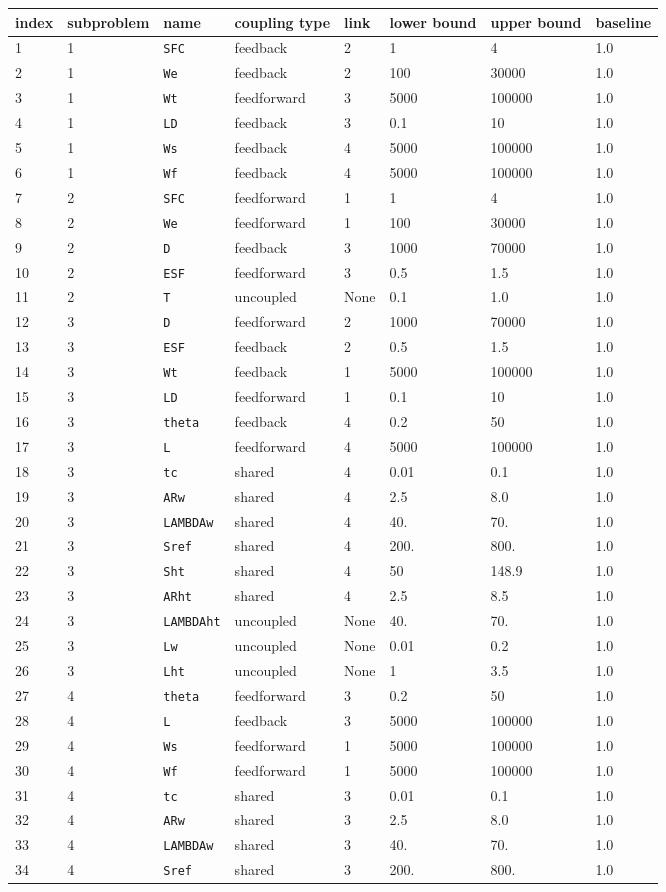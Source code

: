 \documentclass[11pt]{article}
\begin{document}
\begin{longtable}[]{@{}llllllll@{}}
\toprule
index & subproblem & name & coupling type & link & lower bound & upper
bound & baseline\tabularnewline
\midrule
\endhead
1 & 1 & \texttt{SFC} & feedback & 2 & 1 & 4 & 1.0\tabularnewline
2 & 1 & \texttt{We} & feedback & 2 & 100 & 30000 & 1.0\tabularnewline
3 & 1 & \texttt{Wt} & feedforward & 3 & 5000 & 100000 &
1.0\tabularnewline
4 & 1 & \texttt{LD} & feedback & 3 & 0.1 & 10 & 1.0\tabularnewline
5 & 1 & \texttt{Ws} & feedback & 4 & 5000 & 100000 & 1.0\tabularnewline
6 & 1 & \texttt{Wf} & feedback & 4 & 5000 & 100000 & 1.0\tabularnewline
7 & 2 & \texttt{SFC} & feedforward & 1 & 1 & 4 & 1.0\tabularnewline
8 & 2 & \texttt{We} & feedforward & 1 & 100 & 30000 & 1.0\tabularnewline
9 & 2 & \texttt{D} & feedback & 3 & 1000 & 70000 & 1.0\tabularnewline
10 & 2 & \texttt{ESF} & feedforward & 3 & 0.5 & 1.5 & 1.0\tabularnewline
11 & 2 & \texttt{T} & uncoupled & None & 0.1 & 1.0 & 1.0\tabularnewline
12 & 3 & \texttt{D} & feedforward & 2 & 1000 & 70000 &
1.0\tabularnewline
13 & 3 & \texttt{ESF} & feedback & 2 & 0.5 & 1.5 & 1.0\tabularnewline
14 & 3 & \texttt{Wt} & feedback & 1 & 5000 & 100000 & 1.0\tabularnewline
15 & 3 & \texttt{LD} & feedforward & 1 & 0.1 & 10 & 1.0\tabularnewline
16 & 3 & \texttt{theta} & feedback & 4 & 0.2 & 50 & 1.0\tabularnewline
17 & 3 & \texttt{L} & feedforward & 4 & 5000 & 100000 &
1.0\tabularnewline
18 & 3 & \texttt{tc} & shared & 4 & 0.01 & 0.1 & 1.0\tabularnewline
19 & 3 & \texttt{ARw} & shared & 4 & 2.5 & 8.0 & 1.0\tabularnewline
20 & 3 & \texttt{LAMBDAw} & shared & 4 & 40. & 70. & 1.0\tabularnewline
21 & 3 & \texttt{Sref} & shared & 4 & 200. & 800. & 1.0\tabularnewline
22 & 3 & \texttt{Sht} & shared & 4 & 50 & 148.9 & 1.0\tabularnewline
23 & 3 & \texttt{ARht} & shared & 4 & 2.5 & 8.5 & 1.0\tabularnewline
24 & 3 & \texttt{LAMBDAht} & uncoupled & None & 40. & 70. &
1.0\tabularnewline
25 & 3 & \texttt{Lw} & uncoupled & None & 0.01 & 0.2 &
1.0\tabularnewline
26 & 3 & \texttt{Lht} & uncoupled & None & 1 & 3.5 & 1.0\tabularnewline
27 & 4 & \texttt{theta} & feedforward & 3 & 0.2 & 50 &
1.0\tabularnewline
28 & 4 & \texttt{L} & feedback & 3 & 5000 & 100000 & 1.0\tabularnewline
29 & 4 & \texttt{Ws} & feedforward & 1 & 5000 & 100000 &
1.0\tabularnewline
30 & 4 & \texttt{Wf} & feedforward & 1 & 5000 & 100000 &
1.0\tabularnewline
31 & 4 & \texttt{tc} & shared & 3 & 0.01 & 0.1 & 1.0\tabularnewline
32 & 4 & \texttt{ARw} & shared & 3 & 2.5 & 8.0 & 1.0\tabularnewline
33 & 4 & \texttt{LAMBDAw} & shared & 3 & 40. & 70. & 1.0\tabularnewline
34 & 4 & \texttt{Sref} & shared & 3 & 200. & 800. & 1.0\tabularnewline

\end{longtable}
\end{document}
